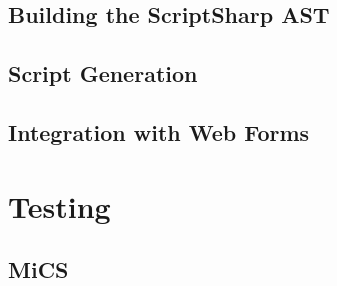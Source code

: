	\subsection{Building the ScriptSharp AST}

	\subsection{Script Generation}

	\subsection{Integration with Web Forms}

\section{Testing}

	\subsection{MiCS}